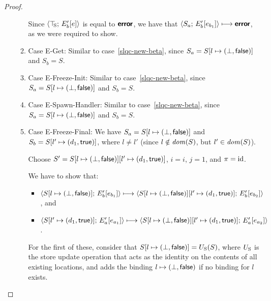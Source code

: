 \begin{proof}
\begin{enumerate}
\begin{enumerate}
      Since $\langle \top\hspace{-0.85mm}_{\mathrm{S}};\, E'_b\hspace{-0.5mm}\left[e\right] \rangle$ is equal to $\textbf{\textsf{error}}$,
      we have that $\langle S_a;\, E'_b\hspace{-0.5mm}\left[e_{b_1}\right] \rangle \longmapsto
      \textbf{\textsf{error}}$, as we were required to show.

    \item \label{slqc-new-get}Case {\sc E-Get}: Similar to
      case~\ref{slqc-new-beta}, since $S_a =
      S[l \mapsto (\bot, \textsf{false})]$ and $S_b = S$.
    \item \label{slqc-new-freeze-init}Case {\sc E-Freeze-Init}:
      Similar to case~\ref{slqc-new-beta}, since $S_a =
      S[l \mapsto (\bot, \textsf{false})]$ and $S_b = S$.
    \item \label{slqc-new-spawn-handler}Case {\sc E-Spawn-Handler}:
      Similar to case~\ref{slqc-new-beta}, since $S_a =
      S[l \mapsto (\bot, \textsf{false})]$ and $S_b = S$.
    \item \label{slqc-new-freeze-final}Case {\sc E-Freeze-Final}: We
      have $S_a = S[l \mapsto (\bot, \textsf{false})]$ and $S_b =
      S[l' \mapsto (d_1, \textsf{true})]$, where $l \neq l'$ (since $l
      \notin \mathit{dom}(S)$, but $l' \in \mathit{dom}(S)$).

      Choose $S' =
      S[l \mapsto (\bot, \textsf{false})][l' \mapsto (d_1, \textsf{true})]$,
      $i = i$, $j = 1$, and $\pi = \mathrm{id}$.

      We have to show that:
      \begin{itemize}
      \item
        $\langle S[l \mapsto (\bot, \textsf{false})];\, E'_b\hspace{-0.5mm}\left[e_{b_1}\right] \rangle
        \longmapsto
        \langle S[l \mapsto (\bot, \textsf{false})][l' \mapsto (d_1, \textsf{true})];\, E'_b\hspace{-0.5mm}\left[e_{b_2}\right] \rangle$,
        and
      \item
        $\langle S[l' \mapsto (d_1, \textsf{true})];\, E'_a\hspace{-0.5mm}\left[e_{a_1}\right] \rangle
        \longmapsto
        \langle S[l \mapsto (\bot, \textsf{false})][l' \mapsto (d_1, \textsf{true})];\, E'_a\hspace{-0.5mm}\left[e_{a_2}\right] \rangle$.
      \end{itemize}

      For the first of these, consider that
      $S[l \mapsto (\bot, \textsf{false})] = U_{\mathrm{S}}(S)$, where $U_{\mathrm{S}}$ is the
      store update operation that acts as the identity on the contents
      of all existing locations, and adds the binding
      $l \mapsto (\bot, \textsf{false})$ if no binding for $l$
      exists.


\end{enumerate}
\end{enumerate}
\end{proof}
